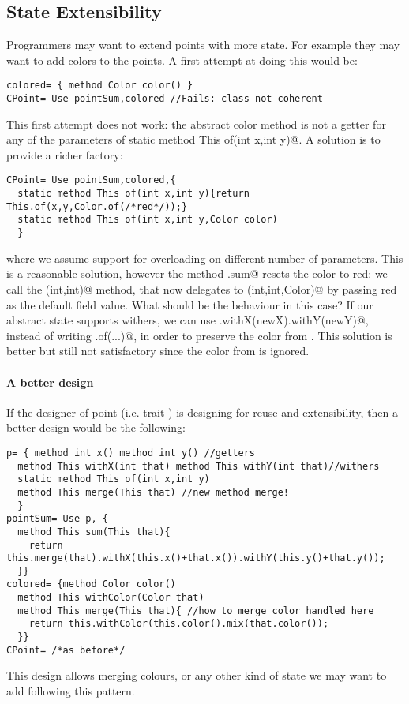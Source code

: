 \subsection{State Extensibility}
Programmers may want to extend points with more state. For example 
they may want to add colors to the points. A first attempt at doing
this would be:
\saveSpace\saveSpace
\begin{lstlisting}
colored= { method Color color() }
CPoint= Use pointSum,colored //Fails: class not coherent
\end{lstlisting}
\saveSpace\saveSpace 
This first attempt does not work: the abstract color method
is not a getter for any of the parameters of 
\Q@ static method This of(int x,int y)@. 
A solution is to provide a richer factory:
\saveSpace\saveSpace 
\begin{lstlisting}
CPoint= Use pointSum,colored,{
  static method This of(int x,int y){return This.of(x,y,Color.of(/*red*/));}
  static method This of(int x,int y,Color color)
  }
\end{lstlisting}
\saveSpace\saveSpace 
\noindent 
where we assume support for overloading on different number of parameters.
This is a reasonable solution, however the method \Q@CPoint.sum@ resets
the color to red: we call the \Q@of(int,int)@ method, that now
delegates to \Q@of(int,int,Color)@ by passing red as the default field
value.  What should be the behaviour in this case?  If our abstract
state supports withers, we can use
\Q@this.withX(newX).withY(newY)@, instead of writing \Q@This.of(...)@, in order to preserve the color from
\Q@this@.  This solution is better but still not satisfactory since the color from \Q@that@ is ignored.

\paragraph{A better design}
If the designer of point (i.e. trait \Q@p@) is designing for reuse and extensibility, then 
a better design would be the following:  
\saveSpace\saveSpace \begin{lstlisting}
p= { method int x() method int y() //getters
  method This withX(int that) method This withY(int that)//withers
  static method This of(int x,int y)
  method This merge(This that) //new method merge!
  }
pointSum= Use p, { 
  method This sum(This that){
    return this.merge(that).withX(this.x()+that.x()).withY(this.y()+that.y());
  }}
colored= {method Color color()
  method This withColor(Color that)
  method This merge(This that){ //how to merge color handled here
    return this.withColor(this.color().mix(that.color());
  }}
CPoint= /*as before*/
\end{lstlisting} \saveSpace\saveSpace 
  \noindent This design allows merging colours, or any other kind of state we may want to add
  following this pattern.%

